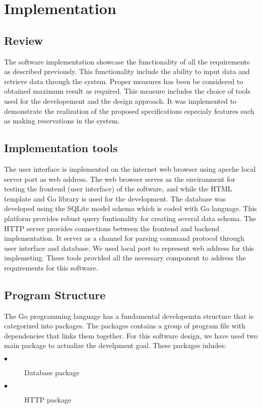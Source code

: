 \chapter{Implementation}
\label{chap:figtab}
\section{Review}
The software implementation showcase the functionality of all the requirements as described previously. This functionality include the ability to input data and retrieve data through the system. Proper measures has been be considered to obtained maximum result as required. This measure includes the choice of tools used for the developement and the design approach. It was implemented to demonstrate the realization of the proposed specifications especialy features such as making reservations in the system.
\section{Implementation tools}
 The user interface is implemented on the internet web browser using apeche local server port as web address. The web browser serves as the environment for testing the frontend (user interface) of the software, and while the HTML template and Go library is used for the development. The database was developed using the SQLite model schema which is coded with Go language.  This platform provides robust query funtionality for creating several data schema. The HTTP server provides connections between the frontend and backend implementation. It server as a channel for parsing command protocol through user interface and database. We used local port to represent  web address for this  implemeting.  These tools provided all the necessary component to address the requirements for this software. 
\section{Program Structure}
The Go programming language has a fundamental developemtn structure that is categorized into packages. The packages contains a group of program file with dependencies that links them together. For this software design, we have used two main package to actualize the develpment goal. These packages inludes:
\begin{description}
\item[$\bullet$]Database package 
\item[$\bullet$]HTTP package 
\end{description}

